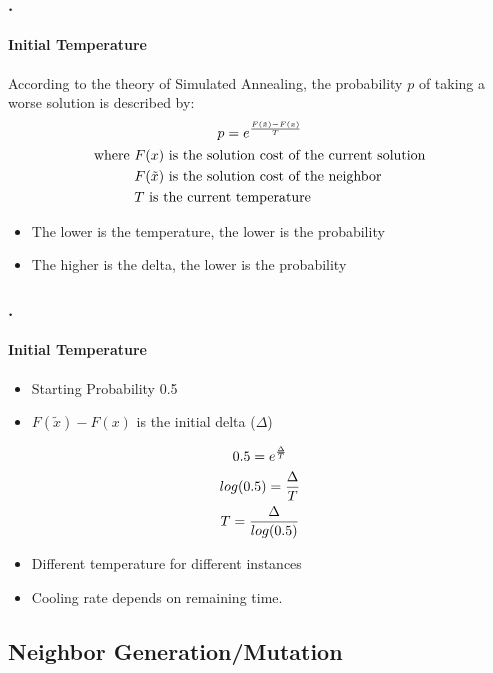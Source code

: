\documentclass{beamer}
\begin{document}
\begin{frame}
\frametitle{\thesection.\thesubsection \ \insertsubsection}
\framesubtitle{Initial Temperature}
	According to the theory of Simulated Annealing, the probability $p$ of taking a worse solution is described by:
	\begin{gather}\label{eq:3.1}
	p = e^{\frac{F(\tilde{x})-F(x)}{T}}\\
\begin{aligned}
\text{where } &F(x) \text{ is the solution cost of the current solution}\\
&F(\tilde{x}) \text{ is the solution cost of the neighbor}\\
&T \text{ is the current temperature}
\end{aligned}\notag
	\end{gather}
	
\vfill
\begin{itemize}
	\item The lower is the temperature, the lower is the probability
	\item The higher is the delta, the lower is the probability
\end{itemize}

\end{frame}
\begin{frame}
\frametitle{\thesection.\thesubsection \ \insertsubsection}
\framesubtitle{Initial Temperature}
\begin{itemize}
	\item Starting Probability 0.5
	\item $F(\tilde{x})-F(x)$ is the initial delta ($\Delta$)
\end{itemize}
\begin{gather}\label{eq:3.2}
0.5 = e^{\frac{\Delta}{T}}\notag\\
log(0.5) = \frac{\Delta}{T}\notag\\
T = \frac{\Delta}{log(0.5)}
\end{gather}
\begin{itemize}
	\item Different temperature for different instances
	\item Cooling rate depends on remaining time.
\end{itemize}

\end{frame}

\subsection{Neighbor Generation/Mutation}
\end{document}
